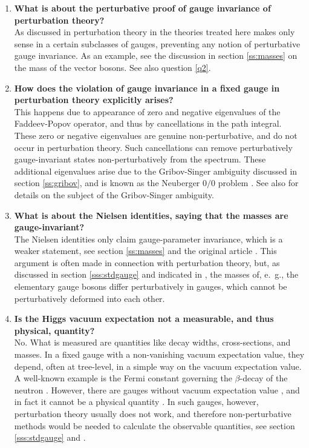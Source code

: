 \documentclass[final,twoside,12pt]{article}
\newcommand*{\1}{1\!\!\!\bot}
\begin{document}
\begin{enumerate}
 \item {\bf What is about the perturbative proof of gauge invariance of perturbation theory?}\\
 As discussed in \cite{Lee:1974zg} perturbation theory in the theories treated here makes only sense in a certain subclasses of gauges, preventing any notion of perturbative gauge invariance. As an example, see the discussion in section \ref{ss:masses} on the mass of the vector bosons. See also question \ref{q2}.
 
 \item {\bf How does the violation of gauge invariance in a fixed gauge in perturbation theory explicitly arises?}\\
 This happens due to appearance of zero and negative eigenvalues of the Faddeev-Popov operator, and thus by cancellations in the path integral. These zero or negative eigenvalues are genuine non-perturbative, and do not occur in perturbation theory. Such cancellations can remove perturbatively gauge-invariant states non-perturbatively from the spectrum. These additional eigenvalues arise due to the Gribov-Singer ambiguity discussed in section \ref{ss:gribov}, and is known as the Neuberger $0/0$ problem \cite{Neuberger:1986xz}. See also \cite{Maas:2011se} for details on the subject of the Gribov-Singer ambiguity.
 
 \item {\bf What is about the Nielsen identities, saying that the masses are gauge-invariant?}\\
 The Nielsen identities only claim gauge-parameter invariance, which is a weaker statement, see section \ref{ss:masses} and the original article \cite{Nielsen:1975fs}. This argument is often made in connection with perturbation theory, but, as discussed in section \ref{sss:stdgauge} and indicated in \cite{Lee:1974zg}, the masses of, e.\ g., the elementary gauge bosons differ perturbatively in gauges, which cannot be perturbatively deformed into each other.
 
 \item {\bf Is the Higgs vacuum expectation not a measurable, and thus physical, quantity?}\\
 No. What is measured are quantities like decay widths, cross-sections, and masses. In a fixed gauge with a non-vanishing vacuum expectation value, they depend, often at tree-level, in a simple way on the vacuum expectation value. A well-known example is the Fermi constant governing the $\beta$-decay of the neutron \cite{Bohm:2001yx}. However, there are gauges without vacuum expectation value \cite{Maas:2012ct,Lee:1974zg}, and in fact it cannot be a physical quantity \cite{Osterwalder:1977pc,Seiler:2015rwa,Fradkin:1978dv}. In such gauges, however, perturbation theory usually does not work, and therefore non-perturbative methods would be needed to calculate the observable quantities, see section \ref{sss:stdgauge} and \cite{Lee:1974zg}.
 

\end{enumerate}
\end{document}

